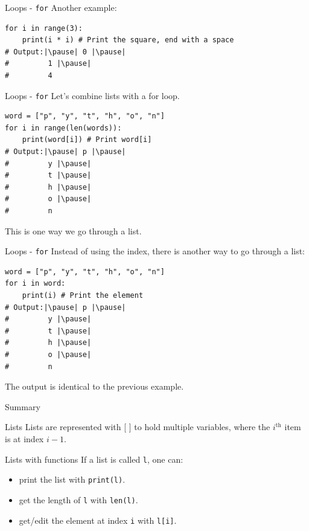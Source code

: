 \documentclass[dvipsnames, svgnames, x11names, handout]{beamer}
\begin{document}
\begin{frame}[fragile]{Loops - \texttt{for}}
Another example:
\begin{verbatim}
for i in range(3):
    print(i * i) # Print the square, end with a space
# Output:|\pause| 0 |\pause|
#         1 |\pause|
#         4
\end{verbatim}
\end{frame}

\begin{frame}[fragile]{Loops - \texttt{for}}
Let's combine lists with a for loop.
\begin{verbatim}
word = ["p", "y", "t", "h", "o", "n"]
for i in range(len(words)):
    print(word[i]) # Print word[i]
# Output:|\pause| p |\pause|
#         y |\pause|
#         t |\pause|
#         h |\pause|
#         o |\pause|
#         n
\end{verbatim}
\pause This is one way we go through a list.
\end{frame}

\begin{frame}[fragile]{Loops - \texttt{for}}
Instead of using the index, there is another way to go through a list:
\begin{verbatim}
word = ["p", "y", "t", "h", "o", "n"]
for i in word:
    print(i) # Print the element
# Output:|\pause| p |\pause|
#         y |\pause|
#         t |\pause|
#         h |\pause|
#         o |\pause|
#         n
\end{verbatim}
\pause The output is identical to the previous example.
\end{frame}

\begin{frame}[fragile]{Summary}
\vspace{-6pt}
\begin{block}{Lists}
Lists are represented with [ ] to hold multiple variables, where the $i^{\text{th}}$ item is at index $i - 1$.\\
\end{block}
\begin{block}{Lists with functions}
If a list is called \texttt{l}, one can:
\begin{itemize}
    \item print the list with \texttt{print(l)}.
    \item get the length of \texttt{l} with \texttt{len(l)}.
    \item get/edit the element at index \texttt{i} with \texttt{l[i]}.
\end{itemize}
\end{block}
\end{frame}
\end{document}
